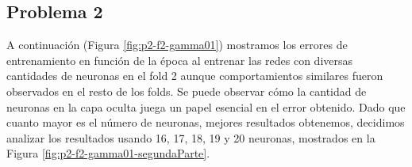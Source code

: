 \documentclass[informe.tex]{subfiles}
\begin{document}
    
    \subsection{Problema 2}
    
      A continuación (Figura \ref{fig:p2-f2-gamma01}) mostramos los errores de entrenamiento en función de la época al entrenar las redes con diversas cantidades de neuronas en el fold 2 aunque comportamientos similares fueron observados en el resto de los folds. Se puede observar cómo la cantidad de neuronas en la capa oculta juega un papel esencial en el error obtenido. Dado que cuanto mayor es el número de neuronas, mejores resultados obtenemos, decidimos analizar los resultados usando 16, 17, 18, 19 y 20 neuronas, mostrados en la Figura \ref{fig:p2-f2-gamma01-segundaParte}.
      
\end{document}

